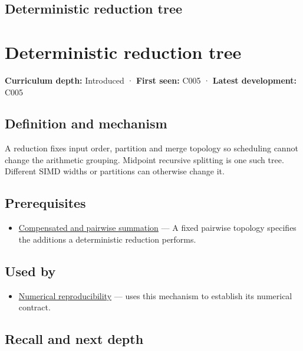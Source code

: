 \hypertarget{appendix-4c8e0238e7ee}{}
\section*{Deterministic reduction tree}
\chapter{Deterministic reduction tree}\label{appendix-4c8e0238e7ee-deterministic-reduction-tree}

\textbf{Curriculum depth:} Introduced · \textbf{First seen:} C005 · \textbf{Latest development:} C005

\section{Definition and mechanism}\label{appendix-4c8e0238e7ee-definition-and-mechanism}

A reduction fixes input order, partition and merge topology so scheduling cannot change the arithmetic grouping. Midpoint recursive splitting is one such tree. Different SIMD widths or partitions can otherwise change it.

\section{Prerequisites}\label{appendix-4c8e0238e7ee-prerequisites}

\begin{itemize}
\tightlist
\item
  \hyperref[appendix-df318da57389]{Compensated and pairwise summation} --- A fixed pairwise topology specifies the additions a deterministic reduction performs.
\end{itemize}

\section{Used by}\label{appendix-4c8e0238e7ee-used-by}

\begin{itemize}
\tightlist
\item
  \hyperref[appendix-5f1a2c3f97ff]{Numerical reproducibility} --- uses this mechanism to establish its numerical contract.
\end{itemize}

\section{Recall and next depth}\label{appendix-4c8e0238e7ee-recall-and-next-depth}


